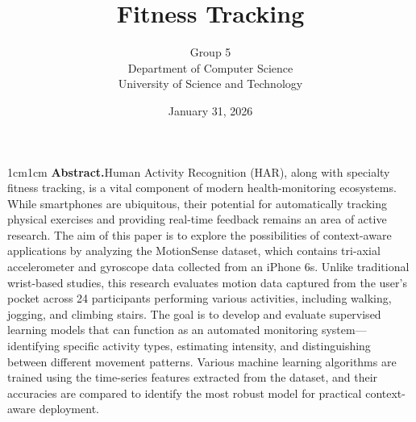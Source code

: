 \documentclass[11pt,a4paper]{article}
\title{Fitness Tracking}
\author{
Group 5\\
\small Department of Computer Science\\
\small University of Science and Technology
}
\date{January 31, 2026}
\begin{document}
\maketitle

\begin{adjustwidth}{1cm}{1cm}
   \noindent \textbf{Abstract.}Human Activity Recognition (HAR), along with specialty fitness tracking, is a vital component of modern health-monitoring ecosystems. While smartphones are ubiquitous, their potential for automatically tracking physical exercises and providing real-time feedback remains an area of active research. The aim of this paper is to explore the possibilities of context-aware applications by analyzing the MotionSense dataset, which contains tri-axial accelerometer and gyroscope data collected from an iPhone 6s. Unlike traditional wrist-based studies, this research evaluates motion data captured from the user's pocket across 24 participants performing various activities, including walking, jogging, and climbing stairs. The goal is to develop and evaluate supervised learning models that can function as an automated monitoring system—identifying specific activity types, estimating intensity, and distinguishing between different movement patterns. Various machine learning algorithms are trained using the time-series features extracted from the dataset, and their accuracies are compared to identify the most robust model for practical context-aware deployment.
\end{adjustwidth}
\end{document}
